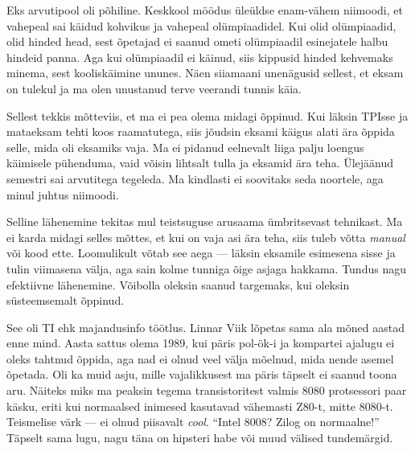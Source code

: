
Eks arvutipool oli põhiline. Keskkool möödus üleüldse enam-vähem 
niimoodi, et vahepeal sai käidud kohvikus ja vahepeal 
olümpiaadidel. Kui olid olümpiaadid, olid hinded head, sest õpetajad ei 
saanud ometi olümpiaadil esinejatele halbu hindeid panna. Aga kui olümpiaadil 
ei käinud, siis kippusid hinded kehvemaks minema, sest kooliskäimine ununes. Näen siiamaani unenägusid sellest, et eksam on 
tulekul ja ma olen unustanud terve veerandi tunnis käia. 

Sellest tekkis mõtteviis, et ma ei pea olema midagi õppinud. Kui läksin
TPIsse ja mataeksam tehti koos raamatutega, siis jõudsin eksami 
käigus alati ära õppida selle, mida oli eksamiks vaja. Ma ei pidanud 
eelnevalt liiga palju loengus käimisele pühenduma, vaid võisin 
lihtsalt tulla ja eksamid ära teha. Ülejäänud semestri sai arvutitega 
tegeleda. Ma kindlasti ei soovitaks seda noortele, aga minul juhtus
niimoodi. 

Selline lähenemine tekitas mul teistsuguse 
arusaama ümbritsevast tehnikast. Ma ei karda midagi selles 
mõttes, et kui on vaja asi ära teha, siis tuleb võtta \emph{manual} või 
kood ette. Loomulikult võtab see aega --- läksin eksamile 
esimesena sisse ja tulin viimasena välja, aga sain kolme tunniga 
õige asjaga hakkama. Tundus nagu efektiivne lähenemine. Võibolla 
oleksin saanud targemaks, kui oleksin süsteemsemalt õppinud. 


See oli TI ehk majandusinfo töötlus. Linnar 
Viik lõpetas sama ala mõned aastad enne mind. 
Aasta sattus olema 1989, kui päris pol-ök-i ja kompartei 
ajalugu ei oleks tahtnud õppida, aga nad ei olnud veel välja 
mõelnud, mida nende asemel õpetada. Oli ka muid asju, mille vajalikkusest ma 
päris täpselt ei saanud toona aru. Näiteks
miks ma peaksin tegema transistoritest valmis 8080 protsessori paar käsku, 
eriti kui normaalsed inimesed kasutavad vähemasti Z80-t, mitte 8080-t. 
Teismelise värk --- ei olnud piisavalt \emph{cool}. \enquote{Intel 8008? 
Zilog on normaalne!} 
Täpselt sama lugu, nagu täna on hipsteri habe või muud välised 
tundemärgid. 

